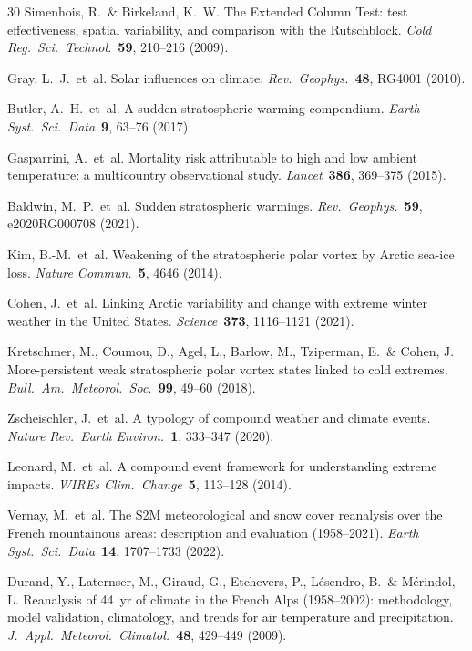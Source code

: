 \documentclass[11pt,letterpaper]{article}
\begin{document}
\begin{thebibliography}{30}
Simenhois, R.\ \& Birkeland, K.~W. The Extended Column Test: test effectiveness, spatial variability, and comparison with the Rutschblock. \textit{Cold Reg.\ Sci.\ Technol.}\ \textbf{59}, 210--216 (2009).

Gray, L.~J.\ et~al. Solar influences on climate. \textit{Rev.\ Geophys.}\ \textbf{48}, RG4001 (2010).

Butler, A.~H.\ et~al. A sudden stratospheric warming compendium. \textit{Earth Syst.\ Sci.\ Data}\ \textbf{9}, 63--76 (2017).

Gasparrini, A.\ et~al. Mortality risk attributable to high and low ambient temperature: a multicountry observational study. \textit{Lancet}\ \textbf{386}, 369--375 (2015).

Baldwin, M.~P.\ et~al. Sudden stratospheric warmings. \textit{Rev.\ Geophys.}\ \textbf{59}, e2020RG000708 (2021).

Kim, B.-M.\ et~al. Weakening of the stratospheric polar vortex by Arctic sea-ice loss. \textit{Nature Commun.}\ \textbf{5}, 4646 (2014).

Cohen, J.\ et~al. Linking Arctic variability and change with extreme winter weather in the United States. \textit{Science}\ \textbf{373}, 1116--1121 (2021).

Kretschmer, M., Coumou, D., Agel, L., Barlow, M., Tziperman, E.\ \& Cohen, J. More-persistent weak stratospheric polar vortex states linked to cold extremes. \textit{Bull.\ Am.\ Meteorol.\ Soc.}\ \textbf{99}, 49--60 (2018).

Zscheischler, J.\ et~al. A typology of compound weather and climate events. \textit{Nature Rev.\ Earth Environ.}\ \textbf{1}, 333--347 (2020).

Leonard, M.\ et~al. A compound event framework for understanding extreme impacts. \textit{WIREs Clim.\ Change}\ \textbf{5}, 113--128 (2014).

Vernay, M.\ et~al. The S2M meteorological and snow cover reanalysis over the French mountainous areas: description and evaluation (1958--2021). \textit{Earth Syst.\ Sci.\ Data}\ \textbf{14}, 1707--1733 (2022).

Durand, Y., Laternser, M., Giraud, G., Etchevers, P., L\'{e}sendro, B.\ \& M\'{e}rindol, L. Reanalysis of 44~yr of climate in the French Alps (1958--2002): methodology, model validation, climatology, and trends for air temperature and precipitation. \textit{J.\ Appl.\ Meteorol.\ Climatol.}\ \textbf{48}, 429--449 (2009).


\end{thebibliography}
\end{document}
